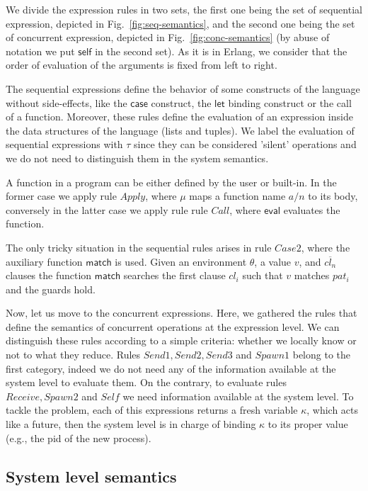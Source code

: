 \documentclass[runningheads]{llncs}
\newcommand{\ms}[1]{\mathsf{#1}}
\newcommand{\ol}[1]{\overline{#1}}
\begin{document}
We divide the expression rules in two sets, the first one being the set of
sequential expression, depicted in Fig.~\ref{fig:seq-semantics}, and the second
one being the set of concurrent expression, depicted in
Fig.~\ref{fig:conc-semantics} (by abuse of notation we put $\ms{self}$ in the
second set).
As it is in Erlang, we consider that the order of evaluation of the arguments is fixed from left to right.

The sequential expressions define the behavior of some constructs of the language
without side-effects, like the $\ms{case}$ construct, the $\ms{let}$ binding
construct or the call of a function. Moreover, these rules define the evaluation
of an expression inside the data structures of the language (lists and tuples).
We label the evaluation of sequential expressions with $\tau$ since they
can be considered 'silent' operations and we do not need to distinguish them in the
system semantics.

A function in a program can be either defined by the user or built-in. In the
former case we apply rule $Apply$, where $\mu$ maps a function name
$a/n$ to its body, conversely in the latter case we apply rule rule $Call$,
where $\ms{eval}$ evaluates the function. 

The only tricky situation in the sequential rules arises in rule $Case2$, where the
auxiliary function $\ms{match}$ is used. Given an environment $\theta$, a value
$v$, and $\ol{cl_n}$ clauses the function $\ms{match}$ searches the first clause
$cl_i$ such that $v$ matches $pat_i$ and the guards hold.

Now, let us move to the concurrent expressions. Here, we gathered the rules that
define the semantics of concurrent operations at the expression level.
We can distinguish these rules according to a simple criteria: whether we
locally know or not to what they reduce. 
Rules $Send1, Send2, Send3$ and $Spawn1$ belong to the first category, indeed we
do not need any of the information available at the system level to evaluate
them.
On the contrary, to evaluate rules $Receive, Spawn2$ and $Self$ we need
information available at the system level. To tackle the problem, each of this
expressions returns a fresh variable $\kappa$, which acts like a future, then
the system level is in charge of binding $\kappa$ to
its proper value (e.g., the pid of the new process).


\subsection{System level semantics}\label{app:sys-sem}
\end{document}
